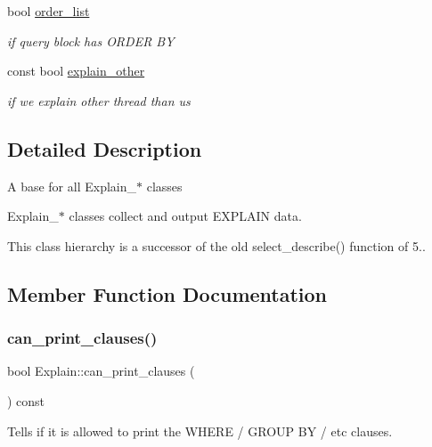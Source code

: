 \begin{DoxyCompactItemize}
bool \mbox{\hyperlink{classExplain_a82528ca908546d506b6b50dcc5aae6ac}{order\+\_\+list}}
\begin{DoxyCompactList}\small\item\em if query block has O\+R\+D\+ER BY \end{DoxyCompactList}\item 
\mbox{\label{classExplain_a575d085642f8c07d3c17d1b3724f7a66}} 
const bool \mbox{\hyperlink{classExplain_a575d085642f8c07d3c17d1b3724f7a66}{explain\+\_\+other}}
\begin{DoxyCompactList}\small\item\em if we explain other thread than us \end{DoxyCompactList}\end{DoxyCompactItemize}


\subsection{Detailed Description}
A base for all Explain\+\_\+$\ast$ classes

Explain\+\_\+$\ast$ classes collect and output E\+X\+P\+L\+A\+IN data.

This class hierarchy is a successor of the old select\+\_\+describe() function of 5.. 

\subsection{Member Function Documentation}
\mbox{\label{classExplain_ab2986073fdc10607ccf78b84fd0a8451}} 
\subsubsection{\texorpdfstring{can\+\_\+print\+\_\+clauses()}{can\_print\_clauses()}}
{\footnotesize\ttfamily bool Explain\+::can\+\_\+print\+\_\+clauses (\begin{DoxyParamCaption}{ }\end{DoxyParamCaption}) const\hspace{0.3cm}{\ttfamily [inline]}}

Tells if it is allowed to print the W\+H\+E\+RE / G\+R\+O\+UP BY / etc clauses. \mbox{\label{classExplain_a82fdfa033238cfb356903c475ef4a177}} 
